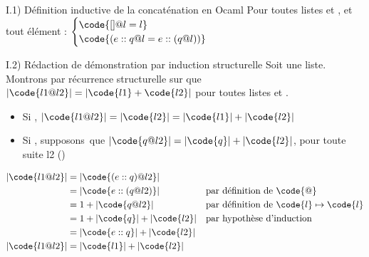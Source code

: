 

\begin{question}{I.1) }{Définition inductive de la concaténation en Ocaml}
    Pour toutes listes  et , et tout élément  :
    $\begin{cases}
        \code{[]@l = l} \\
        \code{(e::q@l = e::(q@l))}
    \end{cases}$

\end{question}

\begin{question}{I.2) }{Rédaction de démonstration par induction structurelle}
    Soit  une liste.
    Montrons par récurrence structurelle sur  que $|\code{l1 @ l2}| = |\code{l1} + \code{l2}|$ pour toutes listes  et .
   \begin{itemize}
       \item Si , $|\code{l1 @ l2}| = |\code{l2}| = |\code{l1}| + |\code{l2}|$
       \item Si , \hbox{supposons que} $|\code{q @ l2}| = |\code{q}| + |\code{l2}|$, pour toute suite l2 () 
    \end{itemize}
    \begin{align*}
        |\code{l1 @ l2}| & = |\code{(e::q) @ l2}| && \\
        & = |\code{e::(q @ l2)}| \quad &&\text{par définition de \code{@}} \\
        & = 1 + |\code{q @ l2}| &&\text{par définition de $\code{l} \mapsto \code{l}$} \\
        & = 1 + |\code{q}| + |\code{l2}|  &&\text{par hypothèse d'induction} \\
        & = |\code{e::q}| + |\code{l2}| && \\
        |\code{l1 @ l2}| & = |\code{l1}| + |\code{l2}| &&
    \end{align*}
\end{question}

